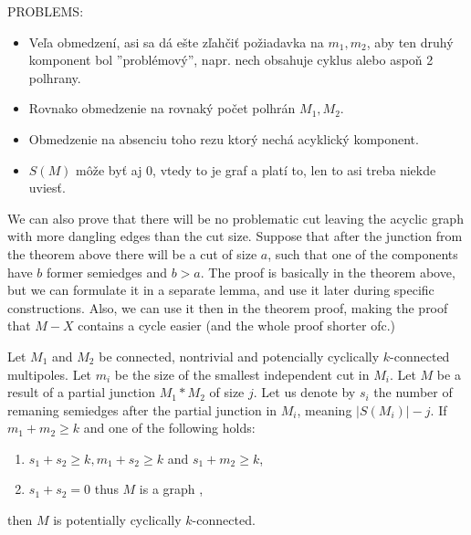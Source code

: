 \documentclass[12pt, twoside]{book}
\begin{document}
PROBLEMS:

\begin{itemize}
	\item Veľa obmedzení, asi sa dá ešte zľahčiť požiadavka na $m_1,m_2$, aby ten druhý komponent bol ''problémový'', napr. nech obsahuje cyklus alebo aspoň 2 polhrany.
	\item Rovnako obmedzenie na rovnaký počet polhrán $M_1,M_2$.
	\item Obmedzenie na absenciu toho rezu ktorý nechá acyklický komponent.
	\item $S(M)$ môže byť aj 0, vtedy to je graf a platí to, len to asi treba niekde uviesť.
\end{itemize}

\todo{}We can also prove that there will be no problematic cut leaving the acyclic graph with more dangling edges than the cut size. Suppose that after the junction from the theorem above there will be a cut of size $a$, such that one of the components have $b$ former semiedges and $b>a$. The proof is basically in the theorem above, but we can formulate it in a separate lemma, and use it later during specific constructions. Also, we can use it then in the theorem proof, making the proof that $M-X$ contains a cycle easier (and the whole proof shorter ofc.)

\begin{theorem}\label{th:connecting-potencially-cyclically-connected-with-number-of-resulting-semiedges}
	Let $M_1$ and $M_2$ be connected, nontrivial and potencially cyclically $k$-connected multipoles. Let $m_i$ be the size of the smallest independent cut in $M_i$. Let $M$ be a result of a partial junction $M_1*M_2$ of size $j$. Let us denote by $s_i$ the number of remaning semiedges after the partial junction in $M_i$, meaning $|S(M_i)|-j$. If $m_1+m_2\geq k$ and one of the following holds:
	
	\begin{enumerate}
		\item $s_1+s_2\geq k, m_1+s_2\geq k$ and $s_1+m_2\geq k$,
		\item $s_1+s_2=0$ thus $M$ is a graph ,
	\end{enumerate}

	then $M$ is potentially cyclically $k$-connected.
\end{theorem}
\end{document}
